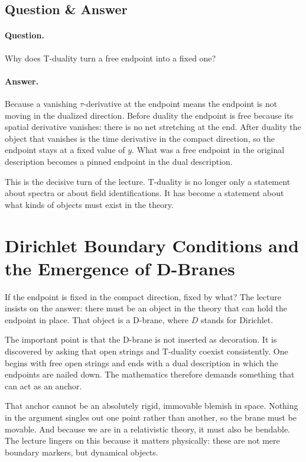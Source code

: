 \subsection{Question \& Answer}

\paragraph{Question.} Why does T-duality turn a free endpoint into a fixed one?

\paragraph{Answer.} Because a vanishing \(\tau\)-derivative at the endpoint means the endpoint is not moving in the dualized direction. Before duality the endpoint is free because its spatial derivative vanishes: there is no net stretching at the end. After duality the object that vanishes is the time derivative in the compact direction, so the endpoint stays at a fixed value of \(y\). What was a free endpoint in the original description becomes a pinned endpoint in the dual description.

This is the decisive turn of the lecture. T-duality is no longer only a statement about spectra or about field identifications. It has become a statement about what kinds of objects must exist in the theory.

\section{Dirichlet Boundary Conditions and the Emergence of D-Branes}

If the endpoint is fixed in the compact direction, fixed by what? The lecture insists on the answer: there must be an object in the theory that can hold the endpoint in place. That object is a D-brane, where \(D\) stands for Dirichlet.

The important point is that the D-brane is not inserted as decoration. It is discovered by asking that open strings and T-duality coexist consistently. One begins with free open strings and ends with a dual description in which the endpoints are nailed down. The mathematics therefore demands something that can act as an anchor.

That anchor cannot be an absolutely rigid, immovable blemish in space. Nothing in the argument singles out one point rather than another, so the brane must be movable. And because we are in a relativistic theory, it must also be bendable. The lecture lingers on this because it matters physically: these are not mere boundary markers, but dynamical objects.

